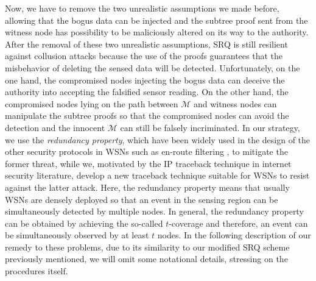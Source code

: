 \documentclass[conference]{IEEEtran}
\begin{document}
Now, we have to remove the two unrealistic assumptions we made before, allowing that the bogus data can be injected and the subtree proof sent from the witness node has possibility to be maliciously altered on its way to the authority. After the removal of these two unrealistic assumptions, SRQ is still resilient against collusion attacks because the use of the proofs guarantees that the misbehavior of deleting the sensed data will be detected. Unfortunately, on the one hand, the compromised nodes injecting the bogus data can deceive the authority into accepting the falsified sensor reading. On the other hand, the compromised nodes lying on the path between $\mathcal{M}$ and witness nodes can manipulate the subtree proofs so that the compromised nodes can avoid the detection and the innocent $\mathcal{M}$ can still be falsely incriminated. In our strategy, we use the \emph{redundancy property}, which have been widely used in the design of the other security protocols in WSNs such as en-route filtering \cite{yg06,yl09,yllz04,zsjn04}, to mitigate the former threat, while we, motivated by the IP traceback technique in internet security literature, develop a new traceback technique suitable for WSNs to resist against the latter attack. Here, the redundancy property means that usually WSNs are densely deployed so that an event in the sensing region can be simultaneously detected by multiple nodes. In general, the redundancy property can be obtained by achieving the so-called $t$-coverage \cite{ht05,mkps01,wxzlpg03} and therefore, an event can be simultaneously observed by at least $t$ nodes. In the following description of our remedy to these problems, due to its similarity to our modified SRQ scheme previously mentioned, we will omit some notational details, stressing on the procedures itself.
\end{document}

